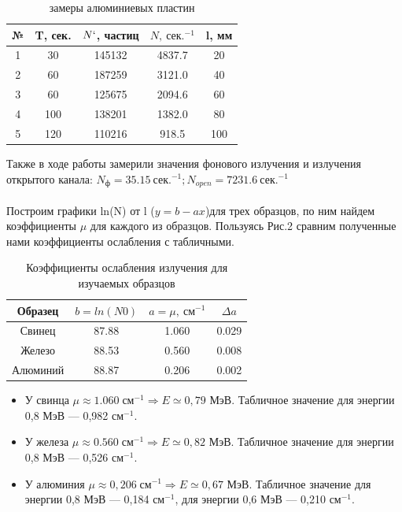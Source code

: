 \documentclass[a4paper,12pt]{article} %
\begin{document}
	\begin{table}[H]
		\centering
		\begin{tabular}{|c|c|c|c|c|}
			\hline
			№ & T, сек.   & $N`$, частиц     & $N, ~\text{сек.}^{-1}$ & l, мм \\ \hline
			1      & 30  & 145132 & 4837.7                   & 20    \\ \hline
			2      & 60  & 187259 & 3121.0                   & 40    \\ \hline
			3      & 60  & 125675 & 2094.6                   & 60    \\ \hline
			4      & 100 & 138201 & 1382.0                   & 80    \\ \hline
			5      & 120 & 110216 & 918.5                    & 100   \\ \hline
		\end{tabular}
		\caption{замеры алюминиевых пластин}
	\end{table}
	Также в ходе работы замерили значения фонового излучения и излучения открытого канала: $N_{\text{ф}} = 35.15 ~\text{сек.}^{-1};N_{open} = 7231.6 ~\text{сек.}^{-1}$\\
	\\
	Построим графики ln(N) от l ($y = b - ax$)для трех образцов, по ним найдем коэффициенты $\mu$ для каждого из образцов. Пользуясь Рис.2 сравним полученные нами коэффициенты ослабления с табличными.
	\begin{table}[H]
		\centering
		\begin{tabular}{|c|c|c|c|}
			\hline
			Образец  & $b = ln(N0)$ & $a = \mu, ~\text{см}^{-1}$ & $\Delta a$ \\ \hline
			Свинец   & 87.88      & 1.060                          & 0.029    \\ \hline
			Железо   & 88.53      & 0.560                          & 0.008    \\ \hline
			Алюминий & 88.87      & 0.206                          & 0.002    \\ \hline
		\end{tabular}
		\caption{Коэффициенты ослабления излучения для изучаемых образцов}
	\end{table}
	\begin{itemize}
		\item У свинца $ \mu \approx  1.060 \; см^{-1} \Rightarrow E \simeq 0,79 $ МэВ. Табличное значение для энергии 0,8 МэВ --- 0,982 $ см^{-1}  $.
		\item У железа $ \mu \approx  0.560 \; см^{-1} \Rightarrow E \simeq 0,82 $ МэВ. Табличное значение для энергии 0,8 МэВ --- 0,526 $ см^{-1}  $.
		\item У алюминия $ \mu \approx  0,206 \; см^{-1} \Rightarrow E \simeq 0,67 $ МэВ. Табличное значение для энергии 0,8 МэВ --- 0,184 $ см^{-1}  $, для энергии 0,6 МэВ --- 0,210 $ см^{-1}  $.
	\end{itemize} 
	
\end{document}
